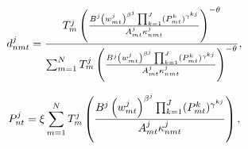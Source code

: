\documentclass{article}
\begin{document}
\begin{equation}
d_{nmt}^{j}=\frac{T_{m}^{j}\left( \frac{B^{j}\left( w_{mt}^{j}\right)
^{\beta ^{j}}\prod_{k=1}^{J}(P_{mt}^{k})^{\gamma ^{kj}}}{A_{mt}^{j}\kappa
_{nmt}^{j}}\right) ^{-\theta }}{\sum_{m=1}^{N}T_{m}^{j}\left( \frac{%
B^{j}\left( w_{mt}^{j}\right) ^{\beta
^{j}}\prod_{k=1}^{J}(P_{mt}^{k})^{\gamma ^{kj}}}{A_{mt}^{j}\kappa _{nmt}^{j}}%
\right) ^{-\theta }},  \label{shares}
\end{equation}

\begin{equation}
P_{nt}^{j}=\xi \sum_{m=1}^{N}T_{m}^{j}\left( \frac{B^{j}\left(
w_{mt}^{j}\right) ^{\beta ^{j}}\prod_{k=1}^{J}(P_{mt}^{k})^{\gamma ^{kj}}}{%
A_{mt}^{j}\kappa _{nmt}^{j}}\right) ,  \label{eq2}
\end{equation}
\end{document}
